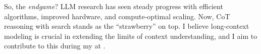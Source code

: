 So, the \textit{endgame}?
%
LLM research has seen steady progress with efficient algorithms, improved hardware, and compute-optimal scaling.
%
Now, CoT reasoning with search stands as the ``strawberry'' on top.
%
I believe long-context modeling is crucial in extending the limits of context understanding, and I aim to contribute to this during my \thedegree at \thecollegeabbr.
